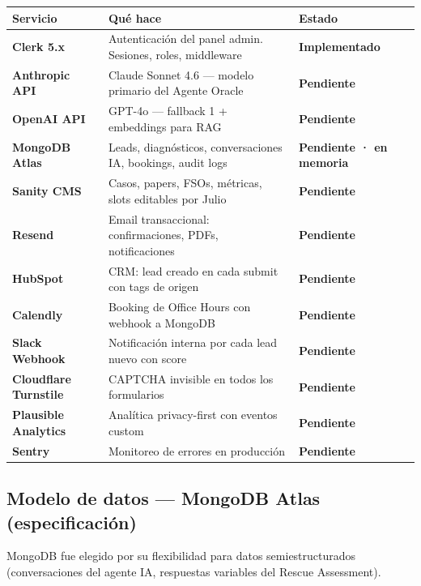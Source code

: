 \documentclass[11pt, a4paper]{article}
\begin{document}
\begin{table}[h]
\centering
\begin{tabularx}{\linewidth}{>{\bfseries}l X >{\small\bfseries}l}
\toprule
Servicio & Qué hace & Estado \\
\midrule
Clerk 5.x &
  Autenticación del panel admin. Sesiones, roles, middleware &
  \color{accent}Implementado \\
Anthropic API &
  Claude Sonnet 4.6 — modelo primario del Agente Oracle &
  \color{danger}Pendiente \\
OpenAI API &
  GPT-4o — fallback 1 + embeddings para RAG &
  \color{danger}Pendiente \\
MongoDB Atlas &
  Leads, diagnósticos, conversaciones IA, bookings, audit logs &
  \color{danger}Pendiente · en memoria \\
Sanity CMS &
  Casos, papers, FSOs, métricas, slots editables por Julio &
  \color{danger}Pendiente \\
Resend &
  Email transaccional: confirmaciones, PDFs, notificaciones &
  \color{danger}Pendiente \\
HubSpot &
  CRM: lead creado en cada submit con tags de origen &
  \color{danger}Pendiente \\
Calendly &
  Booking de Office Hours con webhook a MongoDB &
  \color{danger}Pendiente \\
Slack Webhook &
  Notificación interna por cada lead nuevo con score &
  \color{danger}Pendiente \\
Cloudflare Turnstile &
  CAPTCHA invisible en todos los formularios &
  \color{danger}Pendiente \\
Plausible Analytics &
  Analítica privacy-first con eventos custom &
  \color{danger}Pendiente \\
Sentry &
  Monitoreo de errores en producción &
  \color{danger}Pendiente \\
\bottomrule
\end{tabularx}
\end{table}

\subsection{Modelo de datos — MongoDB Atlas (especificación)}

MongoDB fue elegido por su flexibilidad para datos semiestructurados
(conversaciones del agente IA, respuestas variables del Rescue Assessment).
\end{document}
